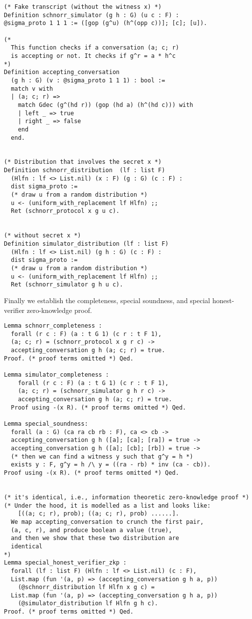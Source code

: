 \documentclass[sigconf]{acmart}
\begin{document}
\begin{lstlisting}[language=Coq]
(* Fake transcript (without the witness x) *)
Definition schnorr_simulator (g h : G) (u c : F) : 
@sigma_proto 1 1 1 := ([gop (g^u) (h^(opp c))]; [c]; [u]).

(* 
  This function checks if a conversation (a; c; r) 
  is accepting or not. It checks if g^r = a * h^c
*)
Definition accepting_conversation 
  (g h : G) (v : @sigma_proto 1 1 1) : bool :=
  match v with
  | (a; c; r) =>  
    match Gdec (g^(hd r)) (gop (hd a) (h^(hd c))) with 
    | left _ => true
    | right _ => false 
    end
  end.


(* Distribution that involves the secret x *)
Definition schnorr_distribution  (lf : list F) 
  (Hlfn : lf <> List.nil) (x : F) (g : G) (c : F) : 
  dist sigma_proto :=
  (* draw u from a random distribution *)
  u <- (uniform_with_replacement lf Hlfn) ;;
  Ret (schnorr_protocol x g u c).


(* without secret x *)
Definition simulator_distribution (lf : list F) 
  (Hlfn : lf <> List.nil) (g h : G) (c : F) : 
  dist sigma_proto :=
  (* draw u from a random distribution *)
  u <- (uniform_with_replacement lf Hlfn) ;;
  Ret (schnorr_simulator g h u c).
\end{lstlisting}

Finally we establish the completeness, special soundness, 
and special honest-verifier zero-knowledge proof. 
\begin{lstlisting}[language=Coq]
Lemma schnorr_completeness : 
  forall (r c : F) (a : t G 1) (c r : t F 1),
  (a; c; r) = (schnorr_protocol x g r c) ->
  accepting_conversation g h (a; c; r) = true.
Proof. (* proof terms omitted *) Qed.

Lemma simulator_completeness : 
    forall (r c : F) (a : t G 1) (c r : t F 1),
    (a; c; r) = (schnorr_simulator g h r c) ->
    accepting_conversation g h (a; c; r) = true.
  Proof using -(x R). (* proof terms omitted *) Qed. 

Lemma special_soundness: 
  forall (a : G) (ca ra cb rb : F), ca <> cb ->
  accepting_conversation g h ([a]; [ca]; [ra]) = true ->  
  accepting_conversation g h ([a]; [cb]; [rb]) = true ->
  (* then we can find a witness y such that g^y = h *)
  exists y : F, g^y = h /\ y = ((ra - rb) * inv (ca - cb)).
Proof using -(x R). (* proof terms omitted *) Qed.


(* it's identical, i.e., information theoretic zero-knowledge proof *)
(* Under the hood, it is modelled as a list and looks like:
    [((a; c; r), prob); ((a; c; r), prob) ......].
  We map accepting_conversation to crunch the first pair, 
  (a, c, r), and produce boolean a value (true), 
  and then we show that these two distribution are 
  identical 
*)
Lemma special_honest_verifier_zkp : 
  forall (lf : list F) (Hlfn : lf <> List.nil) (c : F), 
  List.map (fun '(a, p) => (accepting_conversation g h a, p))
    (@schnorr_distribution lf Hlfn x g c) = 
  List.map (fun '(a, p) => (accepting_conversation g h a, p))
    (@simulator_distribution lf Hlfn g h c).
Proof. (* proof terms omitted *) Qed. 


\end{lstlisting}
\end{document}
